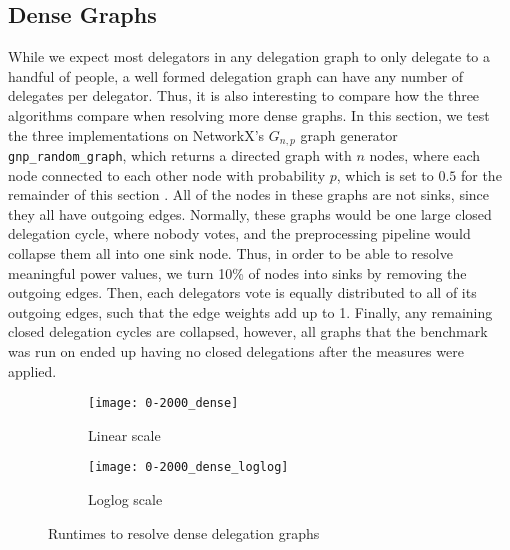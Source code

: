 \subsection{Dense Graphs}

While we expect most delegators in any delegation graph to only delegate to a handful of people, a well formed delegation graph can have any number of delegates per delegator. Thus, it is also interesting to compare how the three algorithms compare when resolving more dense graphs. In this section, we test the three implementations on NetworkX's $G_{n,p}$ graph generator \texttt{gnp\_random\_graph}, which returns a directed graph with $n$ nodes, where each node connected to each other node with probability $p$, which is set to $0.5$ for the remainder of this section \cite{hagbergExploringNetworkStructure2008}. All of the nodes in these graphs are not sinks, since they all have outgoing edges. Normally, these graphs would be one large closed delegation cycle, where nobody votes, and the preprocessing pipeline would collapse them all into one sink node. Thus, in order to be able to resolve meaningful power values, we turn 10\% of nodes into sinks by removing the outgoing edges. Then, each delegators vote is equally distributed to all of its outgoing edges, such that the edge weights add up to 1. Finally, any remaining closed delegation cycles are collapsed, however, all graphs that the benchmark was run on ended up having no closed delegations after the measures were applied.

\begin{figure}[t]
    \centering
    \begin{subfigure}[t]{0.45\textwidth}
    	\centering
    	\texttt{[image: 0-2000\_dense]}
    	\caption{Linear scale}
    	\label{fig:dense-linear}
    \end{subfigure}
    \hfill
    \begin{subfigure}[t]{0.45\textwidth}
        \centering
        \texttt{[image: 0-2000\_dense\_loglog]}
        \caption{Loglog scale}
         \label{subfig:dense-loglog}
    \end{subfigure}
    \caption{Runtimes to resolve dense delegation graphs}
    \label{fig:dense}
\end{figure}

